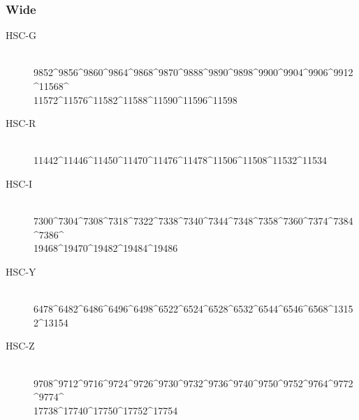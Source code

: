 \documentclass[DM,STS,toc]{lsstdoc}
\begin{document}
\subsubsection{Wide}

\begin{description}

\item[HSC-G]{\hfill \\ 9852\^{}9856\^{}9860\^{}9864\^{}9868\^{}9870\^{}9888\^{}9890\^{}9898\^{}9900\^{}9904\^{}9906\^{}9912\^{}11568\^{}\\11572\^{}11576\^{}11582\^{}11588\^{}11590\^{}11596\^{}11598}
\item[HSC-R]{\hfill \\ 11442\^{}11446\^{}11450\^{}11470\^{}11476\^{}11478\^{}11506\^{}11508\^{}11532\^{}11534}
\item[HSC-I]{\hfill \\ 7300\^{}7304\^{}7308\^{}7318\^{}7322\^{}7338\^{}7340\^{}7344\^{}7348\^{}7358\^{}7360\^{}7374\^{}7384\^{}7386\^{}\\19468\^{}19470\^{}19482\^{}19484\^{}19486}
\item[HSC-Y]{\hfill \\ 6478\^{}6482\^{}6486\^{}6496\^{}6498\^{}6522\^{}6524\^{}6528\^{}6532\^{}6544\^{}6546\^{}6568\^{}13152\^{}13154}
\item[HSC-Z]{\hfill \\ 9708\^{}9712\^{}9716\^{}9724\^{}9726\^{}9730\^{}9732\^{}9736\^{}9740\^{}9750\^{}9752\^{}9764\^{}9772\^{}9774\^{}\\17738\^{}17740\^{}17750\^{}17752\^{}17754}

\end{description}
\end{document}
